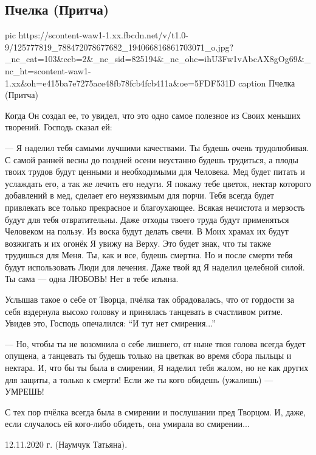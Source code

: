  
 
 

\subsection{Пчелка (Притча)}

\ifcmt
pic https://scontent-waw1-1.xx.fbcdn.net/v/t1.0-9/125777819_788472078677682_194066816861703071_o.jpg?_nc_cat=103&ccb=2&_nc_sid=825194&_nc_ohc=ihU3Fw1vAbcAX8gOg69&_nc_ht=scontent-waw1-1.xx&oh=e415ba7e7275ace48fb78fcb4fcb411a&oe=5FDF531D
caption Пчелка (Притча)
\fi

Когда Он создал ее, то увидел, что это одно самое полезное из Своих меньших творений. Господь сказал ей:

--- Я наделил тебя самыми лучшими качествами. Ты будешь очень трудолюбивая. С
самой ранней весны до поздней осени неустанно будешь трудиться, а плоды твоих
трудов будут ценными и необходимыми для Человека. Мед будет питать и
услаждать его, а так же лечить его недуги. Я покажу тебе цветок, нектар
которого добавлений в мед, сделает его неуязвимым для порчи. Тебя всегда
будет привлекать все только прекрасное и благоухающее. Всякая нечистота и
мерзость будут для  тебя отвратительны. Даже отходы твоего труда будут
применяться Человеком на пользу. Из воска будут делать свечи. В Моих храмах
их будут возжигать и их огонёк Я увижу на Верху. Это будет знак, что ты также
трудишься для Меня. Ты, как и все, будешь смертна. Но и после смерти тебя
будут использовать Люди для лечения. Даже твой яд Я наделил целебной силой.
Ты сама --- одна ЛЮБОВЬ! Нет в тебе изъяна.

Услышав такое о себе от Творца, пчёлка так обрадовалась, что  от гордости
за себя вздернула высоко головку и принялась танцевать в счастливом ритме.
Увидев это, Господь опечалился: \enquote{И тут нет смирения...}

--- Но, чтобы ты не возомнила о себе лишнего, от ныне твоя голова всегда будет
опущена, а танцевать ты будешь только на цветкак во время сбора пыльцы и
нектара. И, что бы ты была в смирении, Я наделил тебя жалом, но не как других
для защиты, а только к смерти! Если же ты кого обидешь (ужалишь) --- УМРЕШЬ!

С тех пор пчёлка всегда была в смирении и послушании пред Творцом. И, даже,
если случалось ей кого-либо обидеть, она умирала во смирении...

12.11.2020 г. (Наумчук Татьяна).
